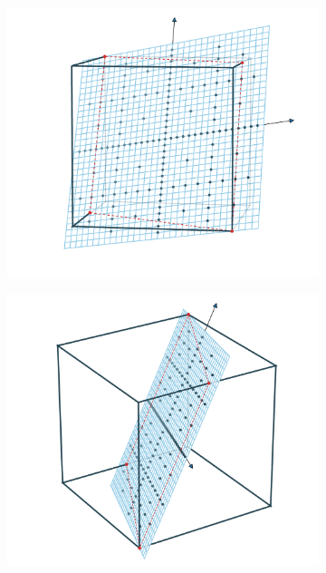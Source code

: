 \documentclass[
  a4paper,  %
  twoside,  %
  bibliography=totoc,
  headsepline,
  cleardoublepage=empty,
  parskip=half,
  draft=false
]{scrbook}
\begin{document}
\begin{mdframed}[style=style]
\vspace{2.5mm}
\begin{figure}[H]
\begin{subfigure}{.5\textwidth}
  \centering
  \includegraphics[width=\linewidth]{graphics/surrogate_vis_2}
\end{subfigure}%
\begin{subfigure}{.5\textwidth}
  \centering
  \includegraphics[width=\linewidth]{graphics/surrogate_vis_1}

\end{subfigure}
\end{figure}
\end{mdframed}
\end{document}
